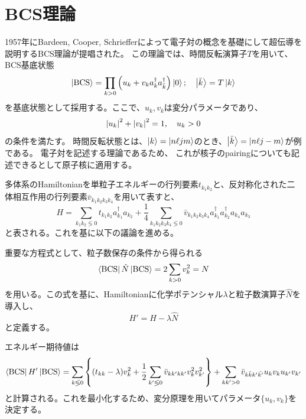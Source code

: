 \documentclass[a4paper,11pt]{jsreport}
\newcommand{\BCSket}{\ket{\text{BCS}}}
\newcommand{\BCSbra}{\bra{\text{BCS}}}
\newcommand{\BCSexp}[1]{\bra{\text{BCS}} {#1} \ket{\text{BCS}}}
\begin{document}
  \section{BCS理論}
  1957年にBardeen, Cooper, Schriefferによって電子対の概念を基礎にして超伝導を説明するBCS理論が提唱された。
  この理論では、時間反転演算子\(T\)を用いて、BCS基底状態
  \begin{equation}
      \BCSket=\prod_{k>0}\left(u_k + v_k a^{\dagger}_ka^{\dagger}_{\bar{k}}\right)\ket{0};\quad\ket{\bar{k}}=T\ket{k}
  \end{equation}
  を基底状態として採用する。ここで、\(u_k,v_k\)は変分パラメータであり、
  \begin{equation}
      \abs{u_k}^2+\abs{v_k}^2=1, \quad u_k>0\label{rest}
  \end{equation}
  の条件を満たす。
  時間反転状態とは、\(\ket{k}=\ket{n\ell j m}\)のとき、\(\ket{\bar{k}}=\ket{n\ell j -m}\)が例である。
  電子対を記述する理論であるため、
  これが核子のpairingについても記述できるとして原子核に適用する。
  \par
  多体系のHamiltonianを単粒子エネルギーの行列要素\(t_{k_1k_2}\)と、反対称化された二体相互作用の行列要素\(\bar{v}_{k_1k_2k_3k_4}\)を用いて表すと、
  \begin{equation}
      H=\sum_{k_1 k_2 \lessgtr  0}t_{k_1 k_2} a^{\dagger}_{k_1}a_{k_2}+
      \dfrac{1}{4}\sum_{k_1k_2k_3k_4\lessgtr0}\bar{v}_{k_1k_2k_3k_4}a^{\dagger}_{k_1}a^{\dagger}_{k_2}a_{k_4}a_{k_3}
  \end{equation}
  と表される。これを基に以下の議論を進める。\par
  重要な方程式として、粒子数保存の条件から得られる
  \begin{equation}
      \BCSbra \hat{N} \BCSket =2 \sum_{k>0} v_k^2 = N\label{number}
  \end{equation}
  を用いる。この式を基に、Hamiltonianに化学ポテンシャル\(\lambda\)と粒子数演算子\(\hat{N}\)を導入し、
  \begin{equation}
      H'=H-\lambda \hat{N}
  \end{equation}
  と定義する。\par
  エネルギー期待値は
  \begin{equation}
      \BCSexp{H'} =\sum_{k\lessgtr0}\left\{(t_{kk}-\lambda)v_{k}^2 +\frac{1}{2}\sum_{k'\lessgtr0}\bar{v}_{kk'kk'}v_{k}^2v_{k'}^2  \right\}
        +\sum_{kk'>0}\bar{v}_{k\bar{k}k'\bar{k'}}u_kv_ku_{k'}v_{k'}
  \end{equation}
  と計算される。これを最小化するため、変分原理を用いてパラメータ\(\{u_k,v_k\}\)を決定する。
\end{document}
